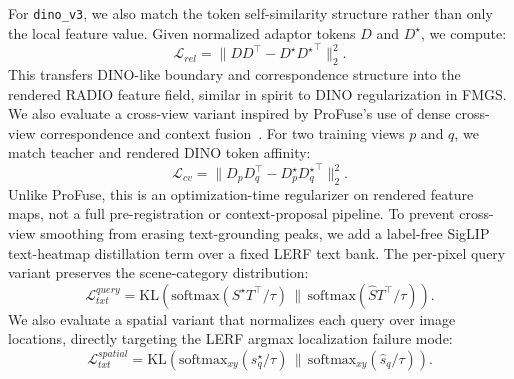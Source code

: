 \documentclass[10pt,twocolumn,letterpaper]{article}
\begin{document}
For \texttt{dino\_v3}, we also match the token self-similarity structure rather
than only the local feature value. Given normalized adaptor tokens $D$ and
$D^{\star}$, we compute:
\begin{equation}
  \mathcal{L}_{rel}
  =
  \|DD^\top - D^{\star}{D^{\star}}^\top\|_2^2.
\end{equation}
This transfers DINO-like boundary and correspondence structure into the
rendered RADIO feature field, similar in spirit to DINO regularization in FMGS.
We also evaluate a cross-view variant inspired by ProFuse's use of dense
cross-view correspondence and context fusion~\cite{chiou2026profuse}. For two
training views $p$ and $q$, we match teacher and rendered DINO token affinity:
\begin{equation}
  \mathcal{L}_{cv}
  =
  \|D_pD_q^\top - D_p^{\star}{D_q^{\star}}^\top\|_2^2.
\end{equation}
Unlike ProFuse, this is an optimization-time regularizer on rendered feature
maps, not a full pre-registration or context-proposal pipeline. To prevent
cross-view smoothing from erasing text-grounding peaks, we add a label-free
SigLIP text-heatmap distillation term over a fixed LERF text bank. The
per-pixel query variant preserves the scene-category distribution:
\begin{equation}
  \mathcal{L}_{txt}^{query}
  =
  \mathrm{KL}(
  \mathrm{softmax}(S^{\star}T^\top/\tau) \,\|\, \mathrm{softmax}(\hat{S}T^\top/\tau)).
\end{equation}
We also evaluate a spatial variant that normalizes each query over image
locations, directly targeting the LERF argmax localization failure mode:
\begin{equation}
  \mathcal{L}_{txt}^{spatial}
  =
  \mathrm{KL}(
  \mathrm{softmax}_{xy}(s_q^{\star}/\tau) \,\|\, \mathrm{softmax}_{xy}(\hat{s}_q/\tau)).
\end{equation}
\end{document}

